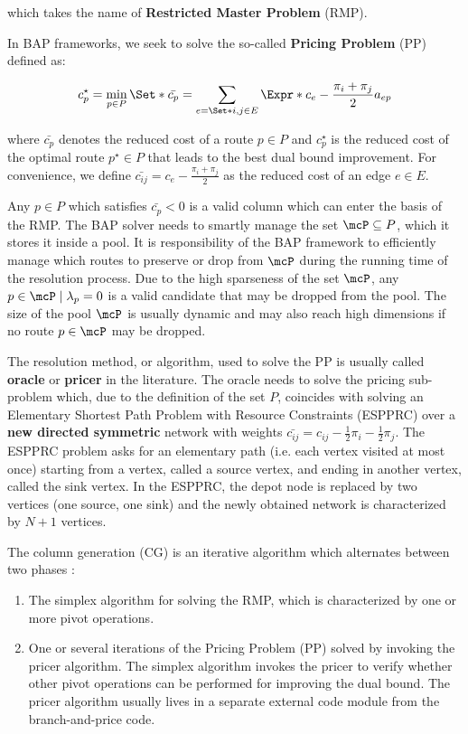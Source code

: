 which takes the name of \textbf{Restricted Master Problem} (RMP).

In BAP frameworks, we seek to solve the so-called \textbf{Pricing Problem} (PP) defined as:

\begin{equation}
	{c^\star_p} = \min_{p \in P} \Set*{ \bar{c_p} = \sum_{e = \Set*{i, j} \in E} \Expr*{c_{e} - \frac{\pi_i + \pi_j}{2}} a_{ep}  }
\end{equation}

where $\bar{c_p}$ denotes the reduced cost of a route $p \in P$
and $c^\star_p$ is the reduced cost of the optimal route $p^\star \in P$
that leads to the best dual bound improvement.
For convenience, we define $\bar{c_{ij}} = c_{e} - \frac{\pi_i + \pi_j}{2}$ as the reduced cost of an edge $e \in E$.

Any $p \in P$ which satisfies $\bar{c_p} < 0$ is a valid column which can enter the basis of the RMP.
The BAP solver needs to smartly manage the set $\mcP \subseteq P$, which it stores it inside a pool.
It is responsibility of the BAP framework to efficiently manage which routes
to preserve or drop from $\mcP$ during the running time of the resolution process.
Due to the high sparseness of the set $\mcP$, any $p \in \mcP \mid \lambda_p = 0$
is a valid candidate that may be dropped from the pool.
The size of the pool $\mcP$ is usually dynamic and may also reach high dimensions
if no route $p \in \mcP$ may be dropped.

\medskip

The resolution method, or algorithm,
used to solve the PP is usually called \textbf{oracle} or \textbf{pricer} in the literature.
The oracle needs to solve the pricing sub-problem which, due to the definition of the set $P$,
coincides with solving an Elementary Shortest Path Problem with Resource Constraints (ESPPRC)
over a \textbf{new directed symmetric} network with weights
$\bar{c_{ij}} = c_{ij} - \frac{1}{2} \pi_i - \frac{1}{2} \pi_j$.
The ESPPRC problem asks for an elementary path (i.e. each vertex visited at most once) starting
from a vertex, called a source vertex, and ending in another vertex, called the sink vertex.
In the ESPPRC, the depot node is replaced by two vertices (one source, one sink)
and the newly obtained network is characterized by $N + 1$ vertices.

\medskip

The column generation (CG) is an iterative algorithm which alternates between two phases \parencite{desaulniers2018}:
\begin{enumerate}
	\item The simplex algorithm for solving the RMP, which is characterized by one or more pivot operations.
	\item One or several iterations of the Pricing Problem (PP) solved by invoking the pricer algorithm.
	      The simplex algorithm invokes the pricer to verify whether other pivot operations
	      can be performed for improving the dual bound.
	      The pricer algorithm usually lives in a separate external code module from the branch-and-price code.
\end{enumerate}

